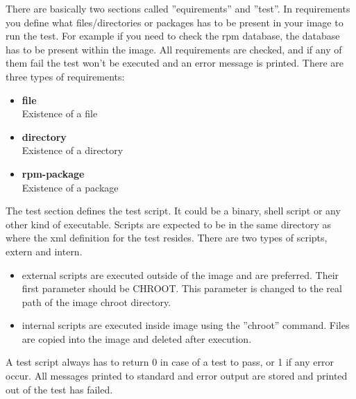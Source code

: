 There are basically two sections called ''equirements'' and ''test''.
In requirements you define what files/directories or packages has to be
present in your image to run the test. For example if you need to check
the rpm database, the database has to be present within the image.
All requirements are checked, and if any of them fail the test won't be
executed and an error message is printed. There are three types of
requirements:

\begin{itemize}
\item \textbf{file}\\
      Existence of a file
\item \textbf{directory}\\
      Existence of a directory
\item \textbf{rpm-package}\\
      Existence of a package
\end{itemize}

The test section defines the test script. It could be a binary,
shell script or any other kind of executable. Scripts are expected to be in
the same directory as where the xml definition for the test resides.
There are two types of scripts, extern and intern.

\begin{itemize}
\item external scripts are executed outside of the image and are preferred.
      Their first parameter should be CHROOT. This parameter
      is changed to the real path of the image chroot directory.

\item internal scripts are executed inside image using the ''chroot'' command.
      Files are copied into the image and deleted after execution.
\end{itemize}

A test script always has to return 0 in case of a test to pass, or 1 if
any error occur. All messages printed to standard and error output are stored
and printed out of the test has failed.


